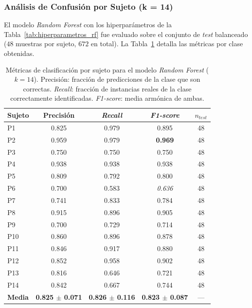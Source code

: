 \subsubsection{Análisis de Confusión por Sujeto (k = 14)}

El modelo \textit{Random Forest} con los hiperparámetros de la Tabla~\ref{tab:hiperparametros_rf} fue evaluado sobre el conjunto de \textit{test} balanceado ($48$ muestras por sujeto, $672$ en total).
La Tabla~\ref{tab:metricas_por_sujeto} detalla las métricas por clase obtenidas.

\begin{table}[h!]
	\centering
	\caption[Métricas de clasificación por sujeto — \textit{Random Forest} ($k=14$).]{Métricas de clasificación por sujeto para el modelo \textit{Random Forest} ($k=14$).
		Precisión: fracción de predicciones de la clase que son correctas. \textit{Recall}: fracción de instancias reales de la clase correctamente identificadas.
		\textit{F1-score}: media armónica de ambas.}
	\label{tab:metricas_por_sujeto}
	\vspace{0.2cm}
	\begin{tabular}{lcccc}
		\toprule
		\textbf{Sujeto} & \textbf{Precisión} & \textbf{\textit{Recall}} & \textbf{\textit{F1-score}} & \textbf{$n_{test}$} \\
		\midrule
		P1  & 0.825 & 0.979 & 0.895 & 48 \\
		P2  & 0.959 & 0.979 & \textbf{0.969} & 48 \\
		P3  & 0.750 & 0.750 & 0.750 & 48 \\
		P4  & 0.938 & 0.938 & 0.938 & 48 \\
		P5  & 0.809 & 0.792 & 0.800 & 48 \\
		P6  & 0.700 & 0.583 & \textit{0.636} & 48 \\
		P7  & 0.741 & 0.833 & 0.784 & 48 \\
		P8  & 0.915 & 0.896 & 0.905 & 48 \\
		P9  & 0.700 & 0.729 & 
		0.714 & 48 \\
		P10 & 0.860 & 0.896 & 0.878 & 48 \\
		P11 & 0.846 & 0.917 & 0.880 & 48 \\
		P12 & 0.852 & 0.958 & 0.902 & 48 \\
		P13 & 0.816 & 0.646 & 0.721 & 48 \\
		P14 & 0.842 & 0.667 & 0.744 & 48 \\
		\midrule
		\textbf{Media} & \textbf{0.825 $\pm$ 0.071} & \textbf{0.826 $\pm$ 0.116} & \textbf{0.823 $\pm$ 0.087} & --- \\
		\bottomrule
	\end{tabular}
\end{table}


